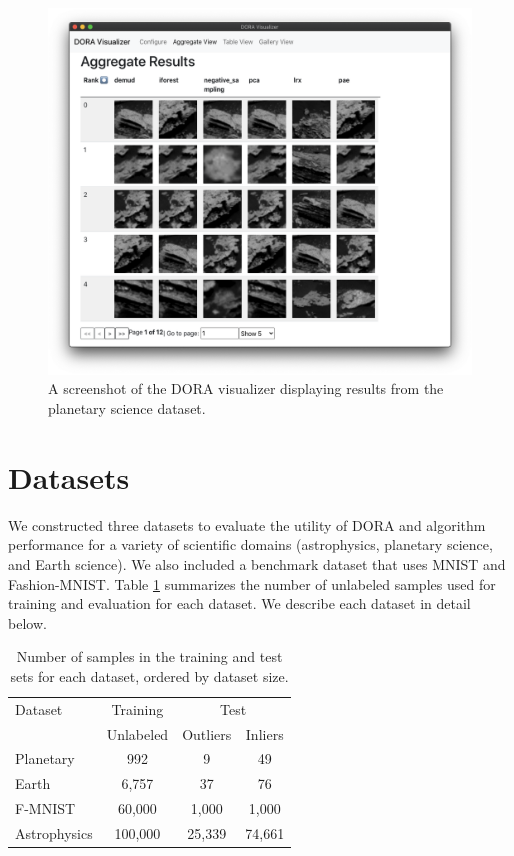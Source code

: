 \documentclass[utf8]{frontiersFPHY} %
\begin{document}
\begin{figure}
  \centering
  \includegraphics[width=0.83\linewidth]{figures/doravis.png}
  \caption{A screenshot of the DORA visualizer displaying results from the
  planetary science dataset.}
  \label{fig:doravis}
\end{figure}


\section{Datasets}
We constructed three datasets to evaluate the utility of DORA and 
algorithm performance for a variety of scientific domains
(astrophysics, planetary science, and Earth science). We also included a 
benchmark dataset that uses MNIST and Fashion-MNIST. Table \ref{tab:datasets}
summarizes the number of unlabeled samples used for training and evaluation for
each dataset. We describe each dataset in detail below.

\begin{table}
\caption{Number of samples in the training and test sets for each dataset,
ordered by dataset size.}
\label{tab:datasets}
\centering
\begin{tabular}{l|c|cc}
  \toprule
  Dataset & Training & \multicolumn{2}{c}{Test}\\
   & Unlabeled &  Outliers &  Inliers \\
  
  \midrule
  Planetary & 992 &  9 & 49 \\
  Earth & 6,757 & 37 & 76  \\
  F-MNIST & 60,000 & 1,000 & 1,000  \\
  Astrophysics & 100,000   &  25,339 &  74,661 \\
  \bottomrule
\end{tabular}
\end{table}
\end{document}
